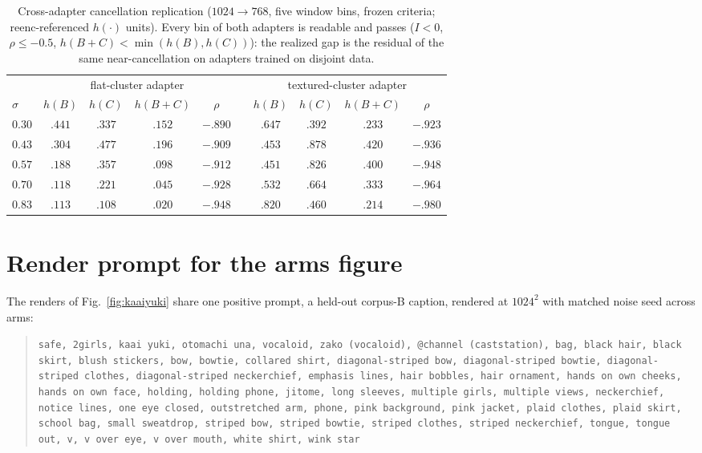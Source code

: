 \begin{table}[h]
\caption{Cross-adapter cancellation replication ($1024{\to}768$, five
window bins, frozen criteria; reenc-referenced $h(\cdot)$ units).
Every bin of both adapters is readable and passes
($I < 0$, $\rho \le -0.5$, $h(B{+}C) < \min(h(B), h(C))$): the
realized gap is the residual of the same near-cancellation on
adapters trained on disjoint data.}
\label{tab:e26}
\centering
\small
\setlength{\tabcolsep}{4.5pt}
\begin{tabular}{lccccccccc}
\toprule
 & \multicolumn{4}{c}{flat-cluster adapter} &
 & \multicolumn{4}{c}{textured-cluster adapter} \\
\cmidrule{2-5}\cmidrule{7-10}
$\sigma$ & $h(B)$ & $h(C)$ & $h(B{+}C)$ & $\rho$ &
 & $h(B)$ & $h(C)$ & $h(B{+}C)$ & $\rho$ \\
\midrule
$0.30$ & $.441$ & $.337$ & $.152$ & $-.890$ & & $.647$ & $.392$ & $.233$ & $-.923$ \\
$0.43$ & $.304$ & $.477$ & $.196$ & $-.909$ & & $.453$ & $.878$ & $.420$ & $-.936$ \\
$0.57$ & $.188$ & $.357$ & $.098$ & $-.912$ & & $.451$ & $.826$ & $.400$ & $-.948$ \\
$0.70$ & $.118$ & $.221$ & $.045$ & $-.928$ & & $.532$ & $.664$ & $.333$ & $-.964$ \\
$0.83$ & $.113$ & $.108$ & $.020$ & $-.948$ & & $.820$ & $.460$ & $.214$ & $-.980$ \\
\bottomrule
\end{tabular}
\end{table}

\section{Render prompt for the arms figure}
\label{app:armsprompt}

The renders of Fig.~\ref{fig:kaaiyuki} share one positive prompt, a
held-out corpus-B caption, rendered at $1024^2$ with matched noise
seed across arms:
\begin{quote}
\scriptsize\texttt{safe, 2girls, kaai yuki, otomachi una, vocaloid,
zako (vocaloid), @channel (caststation), bag, black hair, black
skirt, blush stickers, bow, bowtie, collared shirt, diagonal-striped
bow, diagonal-striped bowtie, diagonal-striped clothes,
diagonal-striped neckerchief, emphasis lines, hair bobbles, hair
ornament, hands on own cheeks, hands on own face, holding, holding
phone, jitome, long sleeves, multiple girls, multiple views,
neckerchief, notice lines, one eye closed, outstretched arm, phone,
pink background, pink jacket, plaid clothes, plaid skirt, school bag,
small sweatdrop, striped bow, striped bowtie, striped clothes,
striped neckerchief, tongue, tongue out, v, v over eye, v over mouth,
white shirt, wink star}
\end{quote}

